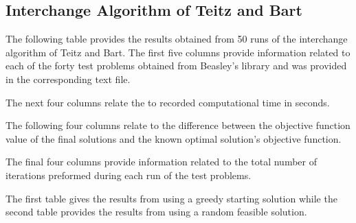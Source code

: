 \documentclass[11pt]{article}
\begin{document}
\begin{appendices}
		\subsection{Interchange Algorithm of Teitz and Bart}
		
		The following table provides the results obtained from 50 runs of the interchange algorithm of Teitz and Bart.  The first five columns provide information related to each of the forty test problems obtained from Beasley's library \cite{BEAS90} and was provided in the corresponding text file.
		
		The next four columns relate the to recorded computational time in seconds.
		
		The following four columns relate to the difference between the objective function value of the final solutions and the known optimal solution's objective function.
		
		The final four columns provide information related to the total number of iterations preformed during each run of the test problems.
		
		The first table gives the results from using a greedy starting solution while the second table provides the results from using a random feasible solution.
		

\end{appendices}
\end{document}
